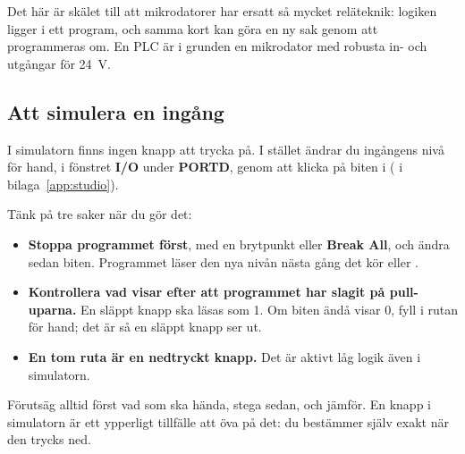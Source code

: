 Det här är skälet till att mikrodatorer har ersatt så mycket reläteknik: logiken ligger i ett
program, och samma kort kan göra en ny sak genom att programmeras om. En PLC är i grunden en
mikrodator med robusta in- och utgångar för 24~V.

\subsection{Att simulera en ingång}
\label{c10:b7}
I simulatorn finns ingen knapp att trycka på. I stället ändrar du ingångens nivå för hand, i
fönstret \textbf{I/O} under \textbf{PORTD}, genom att klicka på biten i 
( i bilaga~\ref{app:studio}).

Tänk på tre saker när du gör det:
\begin{itemize}
  \item \textbf{Stoppa programmet först}, med en brytpunkt eller \textbf{Break All}, och ändra sedan
    biten. Programmet läser den nya nivån nästa gång det kör  eller
    .
  \item \textbf{Kontrollera vad  visar efter att programmet har slagit på pull-uparna.}
    En släppt knapp ska läsas som 1. Om biten ändå visar 0, fyll i rutan för hand; det är så en
    släppt knapp ser ut.
  \item \textbf{En tom ruta är en nedtryckt knapp.} Det är aktivt låg logik även i simulatorn.
\end{itemize}

Förutsäg alltid först vad som ska hända, stega sedan, och jämför. En knapp i simulatorn är ett
ypperligt tillfälle att öva på det: du bestämmer själv exakt när den trycks ned.
